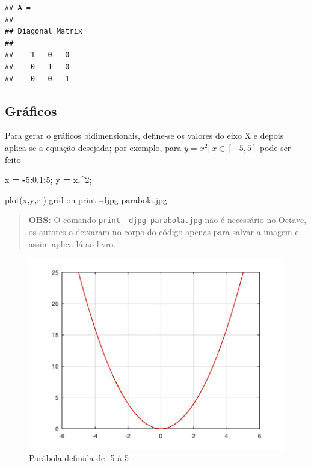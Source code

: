 \documentclass[
]{book}
\newenvironment{Shaded}{\begin{snugshade}}{\end{snugshade}}
\newcommand{\FloatTok}[1]{\textcolor[rgb]{0.00,0.00,0.81}{#1}}
\newcommand{\FunctionTok}[1]{\textcolor[rgb]{0.00,0.00,0.00}{#1}}
\newcommand{\NormalTok}[1]{#1}
\newcommand{\OperatorTok}[1]{\textcolor[rgb]{0.81,0.36,0.00}{\textbf{#1}}}
\newcommand{\StringTok}[1]{\textcolor[rgb]{0.31,0.60,0.02}{#1}}
\begin{document}
\begin{verbatim}
## A =
## 
## Diagonal Matrix
## 
##    1   0   0
##    0   1   0
##    0   0   1
\end{verbatim}

\hypertarget{gruxe1ficos}{%
\subsection{Gráficos}\label{gruxe1ficos}}

Para gerar o gráficos bidimensionais, define-se os valores do eixo X e depois aplica-se a equação desejada; por exemplo, para \(y = x^2 | \ x \in [-5,5]\) pode ser feito

\begin{Shaded}
\begin{Highlighting}[]
\NormalTok{x }\OperatorTok{=} \OperatorTok{{-}}\FloatTok{5}\OperatorTok{:}\FloatTok{0.1}\OperatorTok{:}\FloatTok{5}\OperatorTok{;}
\NormalTok{y }\OperatorTok{=}\NormalTok{ x}\OperatorTok{.\^{}}\FloatTok{2}\OperatorTok{;}

\FunctionTok{plot}\NormalTok{(x}\OperatorTok{,}\NormalTok{y}\OperatorTok{,}\StringTok{\textquotesingle{}r{-}\textquotesingle{}}\NormalTok{)}
\FunctionTok{grid}\NormalTok{ on}
\FunctionTok{print} \OperatorTok{{-}}\NormalTok{djpg parabola.jpg}
\end{Highlighting}
\end{Shaded}

\begin{quote}
\textbf{OBS:} O comando \texttt{print\ -djpg\ parabola.jpg} não é necessário no Octave, os autores o deixaram no corpo do código apenas para salvar a imagem e assim aplica-lá ao livro.
\end{quote}

\begin{figure}

{\centering \includegraphics[width=0.5\linewidth]{parabola} 

}

\caption{Parábola definida de -5 à 5}\label{fig:unnamed-chunk-8}
\end{figure}
\end{document}

